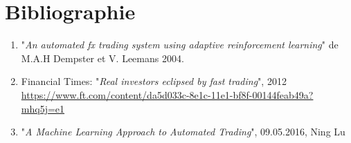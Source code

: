 \documentclass[a4paper, 11pt]{article}
\begin{document}
\section{Bibliographie}

\begin{enumerate}
\item "\textit{An automated fx trading system using adaptive reinforcement learning}" de M.A.H Dempster et V. Leemans 2004. \label{fx trading}

\item Financial Times: "\textit{Real investors eclipsed by fast trading}", 2012 \url{https://www.ft.com/content/da5d033c-8e1c-11e1-bf8f-00144feab49a?mhq5j=e1} \label{real investors}

\item "\textit{A Machine Learning Approach to Automated Trading}", 09.05.2016, Ning Lu \label{machine learning automated trading}


\end{enumerate}
\end{document}
